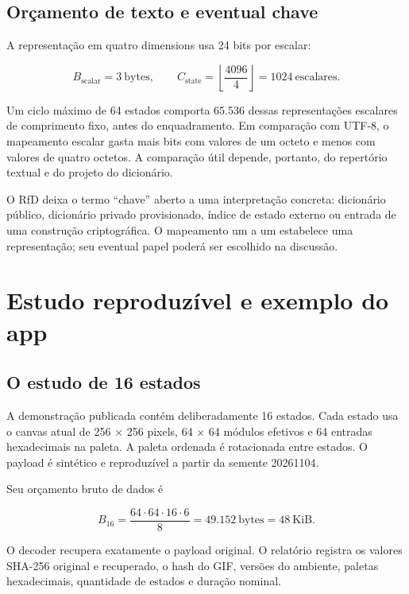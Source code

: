 \documentclass[
  11pt,
  a4paper,
]{article}
\begin{document}
\hypertarget{oruxe7amento-de-texto-e-eventual-chave}{%
\subsection{Orçamento de texto e eventual
chave}\label{oruxe7amento-de-texto-e-eventual-chave}}

A representação em quatro dimensions usa 24 bits por escalar:

\[
B_{\mathrm{scalar}}=3\ \text{bytes},
\qquad
C_{\mathrm{state}}=\left\lfloor\frac{4096}{4}\right\rfloor=1024
\ \text{escalares}.
\]

Um ciclo máximo de 64 estados comporta 65.536 dessas representações
escalares de comprimento fixo, antes do enquadramento. Em comparação com
UTF-8, o mapeamento escalar gasta mais bits com valores de um octeto e
menos com valores de quatro octetos. A comparação útil depende,
portanto, do repertório textual e do projeto do dicionário.

O RfD deixa o termo ``chave'' aberto a uma interpretação concreta:
dicionário público, dicionário privado provisionado, índice de estado
externo ou entrada de uma construção criptográfica. O mapeamento um a um
estabelece uma representação; seu eventual papel poderá ser escolhido na
discussão.

\hypertarget{estudo-reproduzuxedvel-e-exemplo-do-app}{%
\section{Estudo reproduzível e exemplo do
app}\label{estudo-reproduzuxedvel-e-exemplo-do-app}}

\hypertarget{o-estudo-de-16-estados}{%
\subsection{O estudo de 16 estados}\label{o-estudo-de-16-estados}}

A demonstração publicada contém deliberadamente 16 estados. Cada estado
usa o canvas atual de 256 × 256 pixels, 64 × 64 módulos efetivos e 64
entradas hexadecimais na paleta. A paleta ordenada é rotacionada entre
estados. O payload é sintético e reproduzível a partir da semente
20261104.

Seu orçamento bruto de dados é

\[
B_{16}=\frac{64\cdot64\cdot16\cdot6}{8}
=49.152\ \text{bytes}=48\ \text{KiB}.
\]

O decoder recupera exatamente o payload original. O relatório registra
os valores SHA-256 original e recuperado, o hash do GIF, versões do
ambiente, paletas hexadecimais, quantidade de estados e duração nominal.
\end{document}

